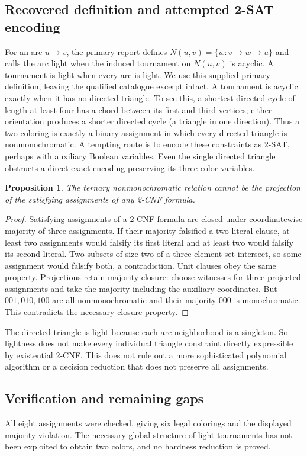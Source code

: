 \documentclass[11pt]{article}
\newtheorem{proposition}{Proposition}
\begin{document}
\subsection{Recovered definition and attempted 2-SAT encoding}
For an arc $u\to v$, the primary report defines $N(u,v)=\{w:v\to w\to u\}$ and calls the arc light when the induced tournament on $N(u,v)$ is acyclic. A tournament is light when every arc is light. We use this supplied primary definition, leaving the qualified catalogue excerpt intact.
A tournament is acyclic exactly when it has no directed triangle. To see this, a shortest directed cycle of length at least four has a chord between its first and third vertices; either orientation produces a shorter directed cycle (a triangle in one direction). Thus a two-coloring is exactly a binary assignment in which every directed triangle is nonmonochromatic.
A tempting route is to encode these constraints as 2-SAT, perhaps with auxiliary Boolean variables. Even the single directed triangle obstructs a direct exact encoding preserving its three color variables.
\begin{proposition}
The ternary nonmonochromatic relation cannot be the projection of the satisfying assignments of any 2-CNF formula.
\end{proposition}
\begin{proof}
Satisfying assignments of a 2-CNF formula are closed under coordinatewise majority of three assignments. If their majority falsified a two-literal clause, at least two assignments would falsify its first literal and at least two would falsify its second literal. Two subsets of size two of a three-element set intersect, so some assignment would falsify both, a contradiction. Unit clauses obey the same property. Projections retain majority closure: choose witnesses for three projected assignments and take the majority including the auxiliary coordinates.
But $001,010,100$ are all nonmonochromatic and their majority $000$ is monochromatic. This contradicts the necessary closure property.
\end{proof}
The directed triangle is light because each arc neighborhood is a singleton. So lightness does not make every individual triangle constraint directly expressible by existential 2-CNF. This does not rule out a more sophisticated polynomial algorithm or a decision reduction that does not preserve all assignments.
\subsection{Verification and remaining gaps}
All eight assignments were checked, giving six legal colorings and the displayed majority violation. The necessary global structure of light tournaments has not been exploited to obtain two colors, and no hardness reduction is proved.
\end{document}
